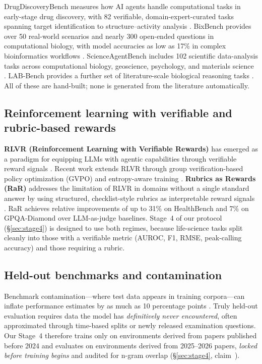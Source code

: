 DrugDiscoveryBench measures how AI agents handle computational tasks in
early-stage drug discovery, with 82 verifiable, domain-expert-curated tasks
spanning target identification to structure--activity analysis
\cite{drugdiscoverybench}. BixBench provides over 50 real-world scenarios and
nearly 300 open-ended questions in computational biology, with model accuracies
as low as 17\% in complex bioinformatics workflows \cite{bixbench}.
ScienceAgentBench includes 102 scientific data-analysis tasks across
computational biology, geoscience, psychology, and materials science
\cite{scienceagentbench}. LAB-Bench provides a further set of literature-scale
biological reasoning tasks \cite{labbench}. All of these are hand-built; none is
generated from the literature automatically.

\subsection{Reinforcement learning with verifiable and rubric-based rewards}

\textbf{RLVR (Reinforcement Learning with Verifiable Rewards)} has emerged as a
paradigm for equipping LLMs with agentic capabilities through verifiable reward
signals \cite{rlvr}. Recent work extends RLVR through group verification-based
policy optimization (GVPO) \cite{gvpo} and entropy-aware training
\cite{entropyaware}. \textbf{Rubrics as Rewards (RaR)} addresses the limitation
of RLVR in domains without a single standard answer by using structured,
checklist-style rubrics as interpretable reward signals \cite{rar}. RaR achieves
relative improvements of up to 31\% on HealthBench and 7\% on GPQA-Diamond over
LLM-as-judge baselines. Stage~4 of our protocol (\S\ref{sec:stage4}) is designed
to use both regimes, because life-science tasks split cleanly into those with a
verifiable metric (AUROC, F1, RMSE, peak-calling accuracy) and those requiring a
rubric.

\subsection{Held-out benchmarks and contamination}

Benchmark contamination---where test data appears in training corpora---can
inflate performance estimates by as much as 10 percentage points
\cite{contamination}. Truly held-out evaluation requires data the model has
\emph{definitively never encountered}, often approximated through time-based
splits or newly released examination questions. Our Stage~4 therefore trains only
on environments derived from papers published before 2024 and evaluates on
environments derived from 2025--2026 papers, \emph{locked before training
begins} and audited for n-gram overlap (\S\ref{sec:stage4}, claim~).
